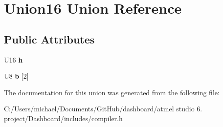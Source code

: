 \hypertarget{union_union16}{\section{Union16 Union Reference}
\label{union_union16}
}
\subsection*{Public Attributes}
\begin{DoxyCompactItemize}
\item 
\hypertarget{union_union16_a9f2c5c86e00fa8f9faf0dfe282d05f68}{U16 {\bfseries h}}\label{union_union16_a9f2c5c86e00fa8f9faf0dfe282d05f68}

\item 
\hypertarget{union_union16_a137ee4e5909593539fd7e08d95ca99c2}{U8 {\bfseries b} \mbox{[}2\mbox{]}}\label{union_union16_a137ee4e5909593539fd7e08d95ca99c2}

\end{DoxyCompactItemize}


The documentation for this union was generated from the following file\-:\begin{DoxyCompactItemize}
\item 
C\-:/\-Users/michael/\-Documents/\-Git\-Hub/dashboard/atmel studio 6. project/\-Dashboard/includes/compiler.\-h\end{DoxyCompactItemize}
